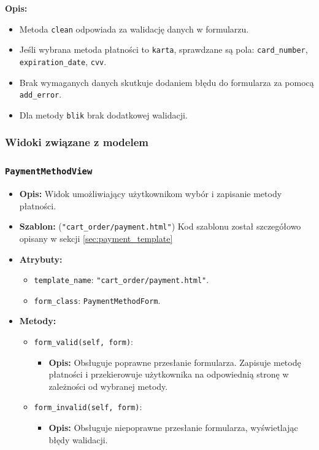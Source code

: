 \documentclass[12pt,a4paper,oneside]{article}
\theoremstyle{definition}
\numberwithin{equation}{section}
\begin{document}
\textbf{Opis:}
\begin{itemize}
    \item Metoda \texttt{clean} odpowiada za walidację danych w formularzu.
    \item Jeśli wybrana metoda płatności to \texttt{karta}, sprawdzane są pola: \texttt{card\_number}, \texttt{expiration\_date}, \texttt{cvv}.
    \item Brak wymaganych danych skutkuje dodaniem błędu do formularza za pomocą \texttt{add\_error}.
    \item Dla metody \texttt{blik} brak dodatkowej walidacji.
\end{itemize}

\subsubsection{Widoki związane z modelem}

\subsubsection*{\texttt{PaymentMethodView}}
\begin{itemize}
    \item \textbf{Opis:} Widok umożliwiający użytkownikom wybór i zapisanie metody płatności.
    \item \textbf{Szablon:} 
        (\texttt{"cart\_order/payment.html"})
        \subsubitem Kod szablonu został szczegółowo opisany w sekcji \ref{sec:payment_template}
    \item \textbf{Atrybuty:}
    \begin{itemize}
        \item \texttt{template\_name}: \texttt{"cart\_order/payment.html"}.
        \item \texttt{form\_class}: \texttt{PaymentMethodForm}.
    \end{itemize}
    \item \textbf{Metody:}
    \begin{itemize}
        \item \texttt{form\_valid(self, form)}:
        \begin{itemize}
            \item \textbf{Opis:} Obsługuje poprawne przesłanie formularza. Zapisuje metodę płatności i przekierowuje użytkownika na odpowiednią stronę w zależności od wybranej metody.
        \end{itemize}
        \item \texttt{form\_invalid(self, form)}:
        \begin{itemize}
            \item \textbf{Opis:} Obsługuje niepoprawne przesłanie formularza, wyświetlając błędy walidacji.
        \end{itemize}
    \end{itemize}
\end{itemize}
\end{document}
